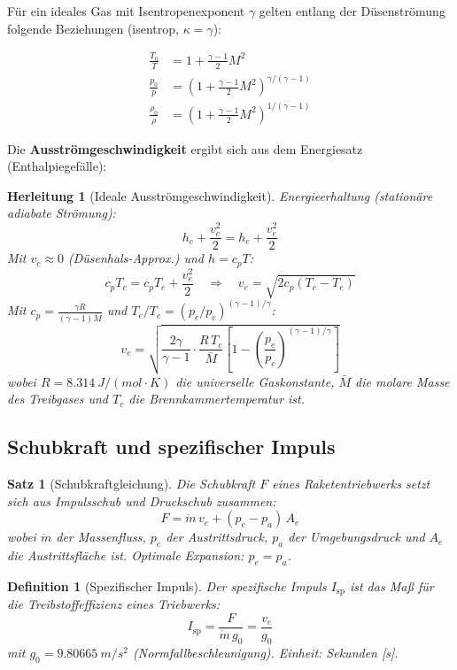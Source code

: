 ﻿\documentclass[12pt,a4paper]{article}
\newtheorem{satz}{Satz}[section]
\newtheorem{definition}{Definition}[section]
\newtheorem{herleitung}{Herleitung}[section]
\newcommand{\Isp}{I_{\mathrm{sp}}}
\newcommand{\ve}{v_e}
\newcommand{\mdot}{\dot{m}}
\begin{document}
Für ein ideales Gas mit Isentropenexponent $\gamma$ gelten entlang der Düsenströmung
folgende Beziehungen (isentrop, $\kappa = \gamma$):

\begin{align}
  \frac{T_0}{T} &= 1 + \frac{\gamma-1}{2}M^2
  \label{eq:temp_machzahl}\\[4pt]
  \frac{p_0}{p} &= \left(1 + \frac{\gamma-1}{2}M^2\right)^{\!\gamma/(\gamma-1)}
  \label{eq:druck_machzahl}\\[4pt]
  \frac{\rho_0}{\rho} &= \left(1 + \frac{\gamma-1}{2}M^2\right)^{\!1/(\gamma-1)}
  \label{eq:dichte_machzahl}
\end{align}

Die \textbf{Ausströmgeschwindigkeit} ergibt sich aus dem Energiesatz (Enthalpiegefälle):

\begin{herleitung}[Ideale Ausströmgeschwindigkeit]
Energieerhaltung (stationäre adiabate Strömung):
\[
  h_c + \frac{v_c^2}{2} = h_e + \frac{v_e^2}{2}
\]
Mit $v_c \approx 0$ (Düsenhals-Approx.) und $h = c_p T$:
\[
  c_p T_c = c_p T_e + \frac{v_e^2}{2}
  \quad\Rightarrow\quad
  v_e = \sqrt{2 c_p (T_c - T_e)}
\]
Mit $c_p = \frac{\gamma R}{(\gamma-1)\bar{M}}$ und $T_e/T_c = (p_e/p_c)^{(\gamma-1)/\gamma}$:
\[
  \boxed{v_e = \sqrt{\frac{2\gamma}{\gamma-1}\cdot\frac{R\,T_c}{\bar{M}}
    \left[1 - \left(\frac{p_e}{p_c}\right)^{(\gamma-1)/\gamma}\right]}}
\]
wobei $R = \SI{8.314}{J/(mol\cdot K)}$ die universelle Gaskonstante,
$\bar{M}$ die molare Masse des Treibgases und $T_c$ die Brennkammertemperatur ist.
\end{herleitung}

\subsection{Schubkraft und spezifischer Impuls}

\begin{satz}[Schubkraftgleichung]
Die Schubkraft $F$ eines Raketentriebwerks setzt sich aus Impulsschub und Druckschub zusammen:
\[
  \boxed{F = \mdot\,\ve + (p_e - p_a)\,A_e}
\]
wobei $\mdot$ der Massenfluss, $p_e$ der Austrittsdruck, $p_a$ der Umgebungsdruck
und $A_e$ die Austrittsfläche ist. Optimale Expansion: $p_e = p_a$.
\end{satz}

\begin{definition}[Spezifischer Impuls]
Der spezifische Impuls $\Isp$ ist das Maß für die Treibstoffeffizienz eines Triebwerks:
\[
  \boxed{\Isp = \frac{F}{\mdot\,g_0} = \frac{\ve}{g_0}}
\]
mit $g_0 = \SI{9.80665}{m/s^2}$ (Normfallbeschleunigung). Einheit: Sekunden [s].
\end{definition}
\end{document}

